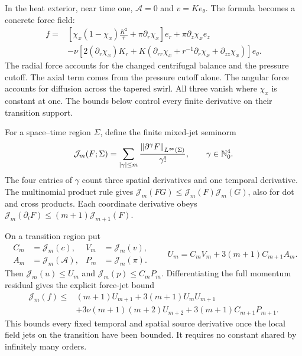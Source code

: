 In the heat exterior, near time one, \(\mathcal A=0\) and
\(v=K e_\theta\). The formula becomes a concrete force field:
\begin{equation}
\begin{aligned}
 f={}&\left[\chi_x(1-\chi_x)\frac{K^2}{r}
                 +\pi\partial_r\chi_x\right]e_r
        +\pi\partial_z\chi_x e_z\\
 &-\nu\left[2(\partial_r\chi_x)K_r
       +K\left(\partial_{rr}\chi_x+r^{-1}\partial_r\chi_x
                         +\partial_{zz}\chi_x\right)\right]e_\theta.
\end{aligned}
\label{r:eq:exterior-cutoff-force-full}
\end{equation}
The radial force accounts for the changed centrifugal balance and the
pressure cutoff. The axial term comes from the pressure cutoff alone.
The angular force accounts for diffusion across the tapered swirl.
All three vanish where \(\chi_x\) is constant at one. The bounds below
control every finite derivative on their transition support.

For a space--time region \(\Sigma\), define the finite mixed-jet
seminorm
\[
 \mathcal J_m(F;\Sigma)
 =\sum_{|\gamma|\le m}\frac{\left\lVert \partial^\gamma F\right\rVert_{L^\infty(\Sigma)}}{\gamma!},
 \qquad \gamma\in\mathbb N_0^4.
\]
The four entries of \(\gamma\) count three spatial derivatives and one
temporal derivative. The multinomial product rule gives
\(\mathcal J_m(FG)\le\mathcal J_m(F)\mathcal J_m(G)\), also for dot
and cross products. Each coordinate derivative obeys
\(\mathcal J_m(\partial_i F)\le(m+1)\mathcal J_{m+1}(F)\).

On a transition region put
\[
 \begin{aligned}
 C_m&=\mathcal J_m(c),& V_m&=\mathcal J_m(v),\\
 A_m&=\mathcal J_m(\mathcal A),& P_m&=\mathcal J_m(\pi).
 \end{aligned}
 \qquad
 U_m=C_mV_m+3(m+1)C_{m+1}A_m.
\]
Then \(\mathcal J_m(u)\le U_m\) and
\(\mathcal J_m(p)\le C_mP_m\). Differentiating the full momentum
residual gives the explicit force-jet bound
\begin{equation}
\begin{aligned}
 \mathcal J_m(f)\le{}&(m+1)U_{m+1}
       +3(m+1)U_mU_{m+1}\\
 &+3\nu(m+1)(m+2)U_{m+2}
       +3(m+1)C_{m+1}P_{m+1}.
\end{aligned}
\label{r:eq:localized-jet-bound}
\end{equation}
This bounds every fixed temporal and spatial source derivative once the
local field jets on the transition have been bounded. It requires no
constant shared by infinitely many orders.

